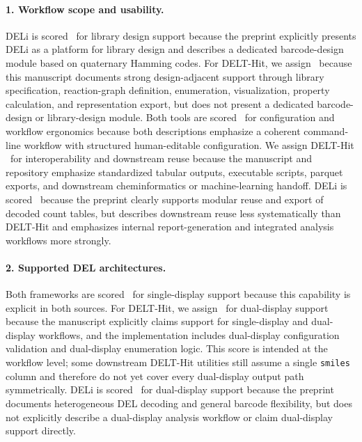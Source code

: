 \documentclass[pdflatex,sn-nature]{sn-jnl}
\begin{document}
\paragraph{1. Workflow scope and usability.}
DELi is scored \statusgreen\ for library design support because the preprint explicitly presents DELi as a platform for library design and describes a dedicated barcode-design module based on quaternary Hamming codes. For DELT-Hit, we assign \statusamber\ because this manuscript documents strong design-adjacent support through library specification, reaction-graph definition, enumeration, visualization, property calculation, and representation export, but does not present a dedicated barcode-design or library-design module. Both tools are scored \statusgreen\ for configuration and workflow ergonomics because both descriptions emphasize a coherent command-line workflow with structured human-editable configuration. We assign DELT-Hit \statusgreen\ for interoperability and downstream reuse because the manuscript and repository emphasize standardized tabular outputs, executable scripts, parquet exports, and downstream cheminformatics or machine-learning handoff. DELi is scored \statusamber\ because the preprint clearly supports modular reuse and export of decoded count tables, but describes downstream reuse less systematically than DELT-Hit and emphasizes internal report-generation and integrated analysis workflows more strongly.

\paragraph{2. Supported DEL architectures.}
Both frameworks are scored \statusgreen\ for single-display support because this capability is explicit in both sources. For DELT-Hit, we assign \statusgreen\ for dual-display support because the manuscript explicitly claims support for single-display and dual-display workflows, and the implementation includes dual-display configuration validation and dual-display enumeration logic. This score is intended at the workflow level; some downstream DELT-Hit utilities still assume a single \texttt{smiles} column and therefore do not yet cover every dual-display output path symmetrically. DELi is scored \statusopen\ for dual-display support because the preprint documents heterogeneous DEL decoding and general barcode flexibility, but does not explicitly describe a dual-display analysis workflow or claim dual-display support directly.
\end{document}
